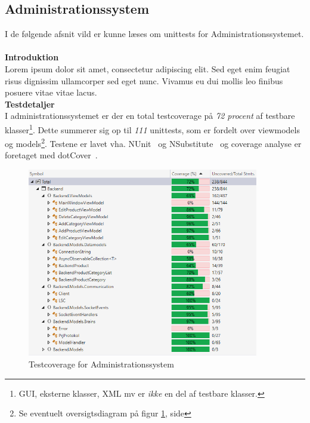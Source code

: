 \subsection{Administrationssystem}
I de følgende afsnit vild er kunne læses om unittests for Administrationssystemet.\\\\


\textbf{Introduktion}\\
Lorem ipsum dolor sit amet, consectetur adipiscing elit. Sed eget enim feugiat risus dignissim ullamcorper sed eget nunc. Vivamus eu dui mollis leo finibus posuere vitae vitae lacus. \\

\textbf{Testdetaljer}\\
I administrationssystemet er der en total testcoverage på \textit{72 procent} af testbare klasser\footnote{GUI, eksterne klasser, XML mv er \textit{ikke} en del af testbare klasser.}. Dette summerer sig op til \textit{111} unittests, som er fordelt over viewmodels og models\footnote{Se eventuelt oversigtsdiagram på figur \ref{fig:oversigtAs}, side \pageref{fig:oversigtAs}}. Testene er lavet vha. NUnit~\cite{NUnit} og NSubstitute~\cite{NSubstitute} og coverage analyse er foretaget med dotCover~\cite{dotCover}.

\begin{figure}[htb]
	\centering
	\includegraphics[width=0.90\textwidth]{Test/Images/Backend/Coverage.png}
	\caption{Testcoverage for Administrationssystem}
	\label{fig:oversigtAs}
	\end{figure}
	
